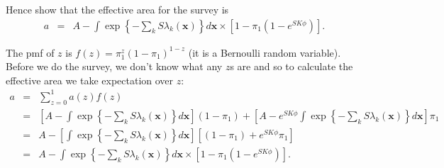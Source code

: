 \begin{questions}
\begin{parts}
\begin{subparts}
{\begin{solution}
\end{solution}}

\item Hence show that the effective area for the survey is
\begin{eqnarray*}
a&=&A-\int\exp\left\{-\sum_k S\lambda_k(\mathbf{x})\right\}d\mathbf{x}\times\left[1-\pi_1\left(1-e^{SK\phi}\right)\right].
\end{eqnarray*}

{\begin{solution}
The pmf of $z$ is $f(z)=\pi_1^z(1-\pi_1)^{1-z}$ (it is a Bernoulli random variable). Before we do the survey, we don't know what any $z$s are and so to calculate the effective area we take expectation over $z$:
\begin{eqnarray}
a&=&\sum_{z=0}^1a(z)f(z) \nonumber \\
&=&\left[A-\int\exp\left\{-\sum_k S\lambda_k(\mathbf{x})\right\}d\mathbf{x}\right](1-\pi_1)
+ \left[A-e^{SK\phi}\int\exp\left\{-\sum_k S\lambda_k(\mathbf{x})\right\}d\mathbf{x}\right]\pi_1 \nonumber \\
&=&A-\left[\int\exp\left\{-\sum_k S\lambda_k(\mathbf{x})\right\}d\mathbf{x}\right]\left[(1-\pi_1)+e^{SK\phi}\pi_1\right] \nonumber \\
&=&A-\int\exp\left\{-\sum_k S\lambda_k(\mathbf{x})\right\}d\mathbf{x}\times\left[1-\pi_1\left(1-e^{SK\phi}\right)\right]. \nonumber
\end{eqnarray}

\end{solution}}


\end{subparts}

\end{parts}




\end{questions}
